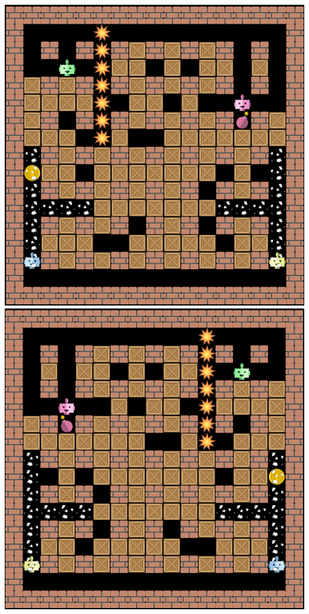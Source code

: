 \vspace{1 cm}
\begin{minipage}{\textwidth}
\includegraphics[scale=0.3]{./images/augmented_original.png}
\includegraphics[scale=0.3]{./images/augmented_lr.png}
\end{minipage}
